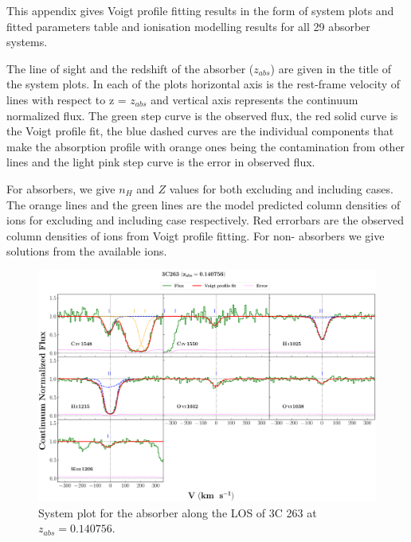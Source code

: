  \label{ap:survey-results}

This appendix gives Voigt profile fitting results in the form of system plots and fitted parameters table and ionisation modelling results for all 29 absorber systems. 

The line of sight and the redshift of the absorber ($z_{abs}$) are given in the title of the system plots. In each of the plots horizontal axis is the rest-frame velocity of lines with respect to z = $z_{abs}$ and vertical axis represents the continuum normalized flux. The green step curve is the observed flux, the red solid curve is the Voigt profile fit, the blue dashed curves are the individual components that make the absorption profile with orange ones being the contamination from other lines and the light pink step curve is the error in observed flux.

For  absorbers, we give $n_H$ and $Z$ values for both excluding and including  cases. The orange lines and the green lines are the model predicted column densities of ions for excluding and including  case respectively. Red errorbars are the observed column densities of ions from Voigt profile fitting. For non- absorbers we give solutions from the available ions.

\newpage


\begin{landscape}

    \begin{figure}
    \centering
    \vspace{-20mm}
    \hspace*{-35mm}
    \includegraphics[width=1.25\linewidth]{System-Plots/3C263_z=0.140756_sys_plot.png}
      \caption{System plot for the absorber along the LOS of 3C 263 at $z_{abs} = 0.140756$. }
    \end{figure}
    
    \end{landscape}
    
